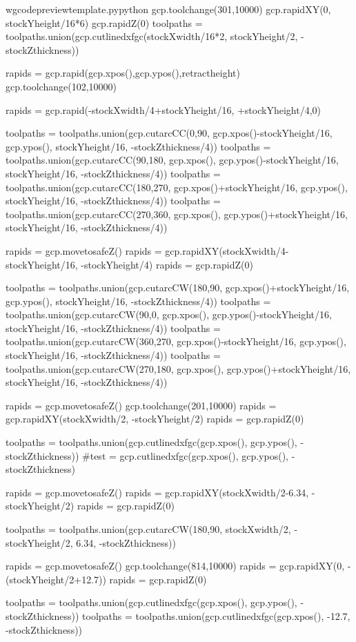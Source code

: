 \documentclass{ltxdoc}
\begin{document}
\begin{writecode}{w}{gcodepreviewtemplate.py}{python}
gcp.toolchange(301,10000)
gcp.rapidXY(0, stockYheight/16*6)
gcp.rapidZ(0)
toolpaths = toolpaths.union(gcp.cutlinedxfgc(stockXwidth/16*2, stockYheight/2, -stockZthickness))

rapids = gcp.rapid(gcp.xpos(),gcp.ypos(),retractheight)
gcp.toolchange(102,10000)

rapids = gcp.rapid(-stockXwidth/4+stockYheight/16, +stockYheight/4,0)

toolpaths = toolpaths.union(gcp.cutarcCC(0,90, gcp.xpos()-stockYheight/16, gcp.ypos(), stockYheight/16, -stockZthickness/4))
toolpaths = toolpaths.union(gcp.cutarcCC(90,180, gcp.xpos(), gcp.ypos()-stockYheight/16, stockYheight/16, -stockZthickness/4))
toolpaths = toolpaths.union(gcp.cutarcCC(180,270, gcp.xpos()+stockYheight/16, gcp.ypos(), stockYheight/16, -stockZthickness/4))
toolpaths = toolpaths.union(gcp.cutarcCC(270,360, gcp.xpos(), gcp.ypos()+stockYheight/16, stockYheight/16, -stockZthickness/4))

rapids = gcp.movetosafeZ()
rapids = gcp.rapidXY(stockXwidth/4-stockYheight/16, -stockYheight/4)
rapids = gcp.rapidZ(0)

toolpaths = toolpaths.union(gcp.cutarcCW(180,90, gcp.xpos()+stockYheight/16, gcp.ypos(), stockYheight/16, -stockZthickness/4))
toolpaths = toolpaths.union(gcp.cutarcCW(90,0, gcp.xpos(), gcp.ypos()-stockYheight/16, stockYheight/16, -stockZthickness/4))
toolpaths = toolpaths.union(gcp.cutarcCW(360,270, gcp.xpos()-stockYheight/16, gcp.ypos(), stockYheight/16, -stockZthickness/4))
toolpaths = toolpaths.union(gcp.cutarcCW(270,180, gcp.xpos(), gcp.ypos()+stockYheight/16, stockYheight/16, -stockZthickness/4))

rapids = gcp.movetosafeZ()
gcp.toolchange(201,10000)
rapids = gcp.rapidXY(stockXwidth/2, -stockYheight/2)
rapids = gcp.rapidZ(0)

toolpaths = toolpaths.union(gcp.cutlinedxfgc(gcp.xpos(), gcp.ypos(), -stockZthickness))
#test = gcp.cutlinedxfgc(gcp.xpos(), gcp.ypos(), -stockZthickness)

rapids = gcp.movetosafeZ()
rapids = gcp.rapidXY(stockXwidth/2-6.34, -stockYheight/2)
rapids = gcp.rapidZ(0)

toolpaths = toolpaths.union(gcp.cutarcCW(180,90, stockXwidth/2, -stockYheight/2, 6.34, -stockZthickness))

rapids = gcp.movetosafeZ()
gcp.toolchange(814,10000)
rapids = gcp.rapidXY(0, -(stockYheight/2+12.7))
rapids = gcp.rapidZ(0)

toolpaths = toolpaths.union(gcp.cutlinedxfgc(gcp.xpos(), gcp.ypos(), -stockZthickness))
toolpaths = toolpaths.union(gcp.cutlinedxfgc(gcp.xpos(), -12.7, -stockZthickness))


\end{writecode}
\end{document}
